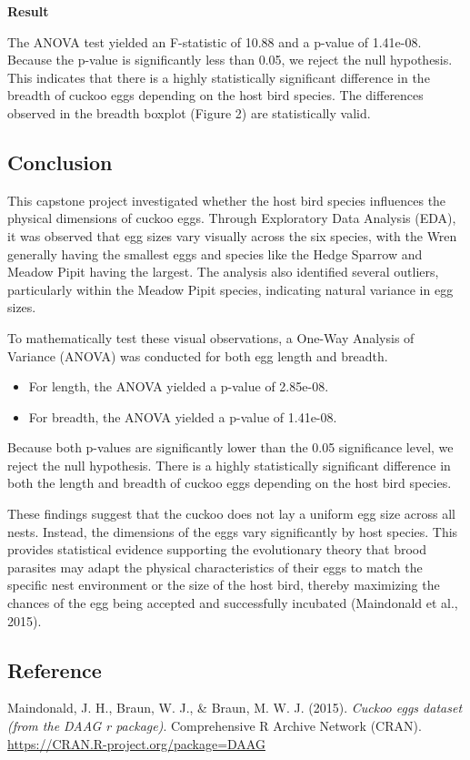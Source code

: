 \documentclass[
  letterpaper,
  DIV=11,
  numbers=noendperiod]{scrartcl}
\newlength{\cslhangindent}
\newenvironment{CSLReferences}[2] %
 {\begin{list}{}{%
  \setlength{\itemindent}{0pt}
  \setlength{\leftmargin}{0pt}
  \setlength{\parsep}{0pt}
  \ifodd #1
   \setlength{\leftmargin}{\cslhangindent}
   \setlength{\itemindent}{-1\cslhangindent}
  \fi
  \setlength{\itemsep}{#2\baselineskip}}}
 {\end{list}}
\begin{document}
\textbf{Result}

The ANOVA test yielded an F-statistic of 10.88 and a p-value of
1.41e-08. Because the p-value is significantly less than 0.05, we reject
the null hypothesis. This indicates that there is a highly statistically
significant difference in the breadth of cuckoo eggs depending on the
host bird species. The differences observed in the breadth boxplot
(Figure 2) are statistically valid.

\subsection{Conclusion}\label{conclusion}

This capstone project investigated whether the host bird species
influences the physical dimensions of cuckoo eggs. Through Exploratory
Data Analysis (EDA), it was observed that egg sizes vary visually across
the six species, with the Wren generally having the smallest eggs and
species like the Hedge Sparrow and Meadow Pipit having the largest. The
analysis also identified several outliers, particularly within the
Meadow Pipit species, indicating natural variance in egg sizes.

To mathematically test these visual observations, a One-Way Analysis of
Variance (ANOVA) was conducted for both egg length and breadth.

\begin{itemize}
\item
  For length, the ANOVA yielded a p-value of 2.85e-08.
\item
  For breadth, the ANOVA yielded a p-value of 1.41e-08.
\end{itemize}

Because both p-values are significantly lower than the 0.05 significance
level, we reject the null hypothesis. There is a highly statistically
significant difference in both the length and breadth of cuckoo eggs
depending on the host bird species.

These findings suggest that the cuckoo does not lay a uniform egg size
across all nests. Instead, the dimensions of the eggs vary significantly
by host species. This provides statistical evidence supporting the
evolutionary theory that brood parasites may adapt the physical
characteristics of their eggs to match the specific nest environment or
the size of the host bird, thereby maximizing the chances of the egg
being accepted and successfully incubated (Maindonald et al., 2015).

\subsection*{Reference}\label{reference}

\protect{}\label{refs}
\begin{CSLReferences}{1}{0}
Maindonald, J. H., Braun, W. J., \& Braun, M. W. J. (2015). \emph{Cuckoo
eggs dataset (from the DAAG r package)}. Comprehensive R Archive Network
(CRAN). \url{https://CRAN.R-project.org/package=DAAG}

\end{CSLReferences}
\end{document}
